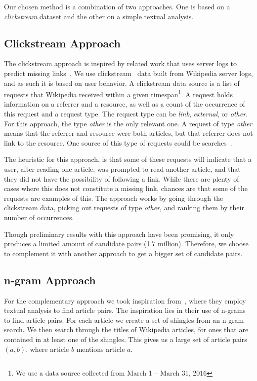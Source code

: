 Our chosen method is a combination of two approaches. One is based on a \emph{clickstream} dataset and the other on a simple textual analysis.

\subsection{Clickstream Approach}\label{sec:candidate_clickstream}

The clickstream approach is inspired by related work that uses server logs to predict missing links~\cite{hyperlink-structure-using-logs}. We use clickstream~\cite{wiki-clickstream} data built from Wikipedia server logs, and as such it is based on user behavior. A clickstream data source is a list of requests that Wikipedia received within a given timespan\footnote{We use a data source collected from March 1 -- March 31, 2016}. A request holds information on a referrer and a resource, as well as a count of the occurrence of this request and a request type. The request type can be \emph{link}, \emph{external}, or \emph{other}. For this approach, the type \emph{other} is the only relevant one. A request of type \emph{other} means that the referrer and resource were both articles, but that referrer does not link to the resource. One source of this type of requests could be searches~\cite{wiki-clickstream}.

The heuristic for this approach, is that some of these requests will indicate that a user, after reading one article, was prompted to read another article, and that they did not have the possibility of following a link. While there are plenty of cases where this does not constitute a missing link, chances are that some of the requests are examples of this. The approach works by going through the clickstream data, picking out requests of type \emph{other}, and ranking them by their number of occurrences.

Though preliminary results with this approach have been promising, it only produces a limited amount of candidate pairs (1.7 million). Therefore, we choose to complement it with another approach to get a bigger set of candidate pairs.

\subsection{n-gram Approach}

For the complementary approach we took inspiration from~\cite{milne2008learning}, where they employ textual analysis to find article pairs. The inspiration lies in their use of n-grams to find article pairs. For each article we create a set of shingles from an n-gram search. We then search through the titles of Wikipedia articles, for ones that are contained in at least one of the shingles. This gives us a large set of article pairs $(a,b)$, where article $b$ mentions article $a$.

